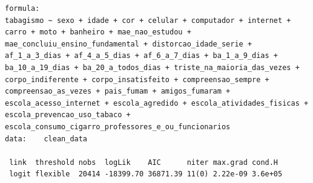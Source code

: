 \documentclass[
]{article}
\begin{document}
\begin{verbatim}
formula: 
tabagismo ~ sexo + idade + cor + celular + computador + internet + carro + moto + banheiro + mae_nao_estudou + mae_concluiu_ensino_fundamental + distorcao_idade_serie + af_1_a_3_dias + af_4_a_5_dias + af_6_a_7_dias + ba_1_a_9_dias + ba_10_a_19_dias + ba_20_a_todos_dias + triste_na_maioria_das_vezes + corpo_indiferente + corpo_insatisfeito + compreensao_sempre + compreensao_as_vezes + pais_fumam + amigos_fumaram + escola_acesso_internet + escola_agredido + escola_atividades_fisicas + escola_prevencao_uso_tabaco +      escola_consumo_cigarro_professores_e_ou_funcionarios
data:    clean_data

 link  threshold nobs  logLik    AIC      niter max.grad cond.H 
 logit flexible  20414 -18399.70 36871.39 11(0) 2.22e-09 3.6e+05


\end{verbatim}
\end{document}
